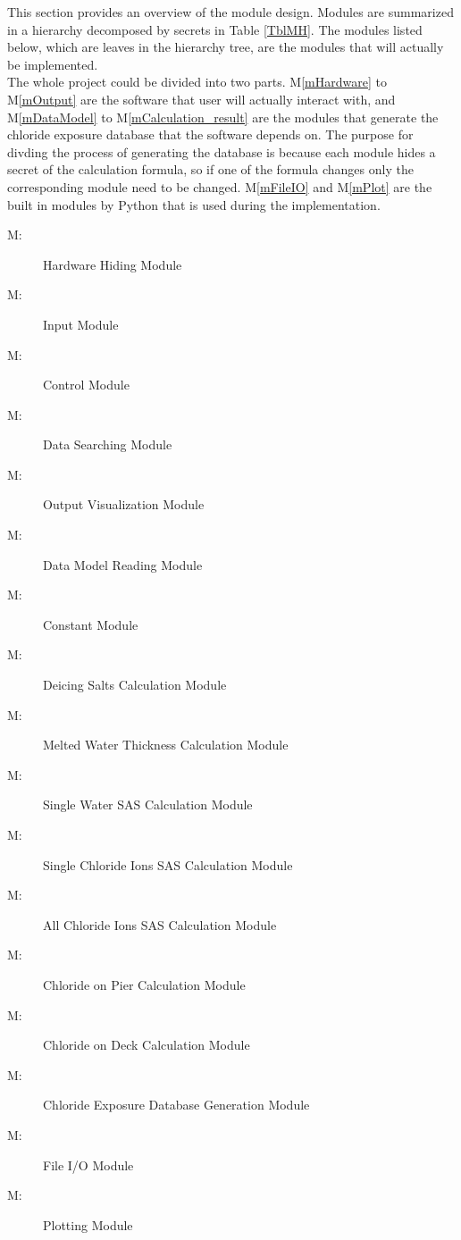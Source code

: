\documentclass[12pt, titlepage]{article}
\newcounter{mnum}
\newcommand{\mthemnum}{M\themnum}
\newcommand{\mref}[1]{M\ref{#1}}
\begin{document}
This section provides an overview of the module design. Modules are summarized
in a hierarchy decomposed by secrets in Table \ref{TblMH}. The modules listed
below, which are leaves in the hierarchy tree, are the modules that will
actually be implemented.\\
The whole project could be divided into two parts. \mref{mHardware} to \mref{mOutput} are the software that user will actually interact with, and \mref{mDataModel} to \mref{mCalculation_result} are the modules that generate the chloride exposure database that the software depends on. The purpose for divding the process of generating the database is because each module hides a secret of the calculation formula, so if one of the formula changes only the corresponding module need to be changed. \mref{mFileIO} and \mref{mPlot} are the built in modules by Python that is used during the implementation.

\begin{description}
\item [ \mthemnum \label{mHardware}:] Hardware Hiding Module
\item [ \mthemnum \label{mInput}:] Input Module
\item [ \mthemnum \label{mControl}:] Control Module
\item [ \mthemnum \label{mSearch}:] Data Searching Module
\item [ \mthemnum \label{mOutput}:] Output Visualization Module
\item [ \mthemnum \label{mDataModel}:] Data Model Reading Module 
\item [ \mthemnum \label{mConstant}:] Constant Module 
\item [ \mthemnum \label{mCalculation_step1}:] Deicing Salts Calculation Module 
\item [ \mthemnum \label{mCalculation_step2}:] Melted Water Thickness Calculation Module 
\item [ \mthemnum \label{mCalculation_step3}:] Single Water SAS Calculation Module 
\item [ \mthemnum \label{mCalculation_step4}:] Single Chloride Ions SAS Calculation Module 
\item [ \mthemnum \label{mCalculation_step5}:] All Chloride Ions SAS Calculation Module 
\item [ \mthemnum \label{mCalculation_step6}:] Chloride on Pier Calculation Module 
\item [ \mthemnum \label{mCalculation_deck}:] Chloride on Deck  Calculation Module 
\item [ \mthemnum \label{mCalculation_result}:] Chloride Exposure Database Generation Module
\item [ \mthemnum \label{mFileIO}:] File I/O Module
\item [ \mthemnum \label{mPlot}:] Plotting Module
\end{description}
\end{document}
